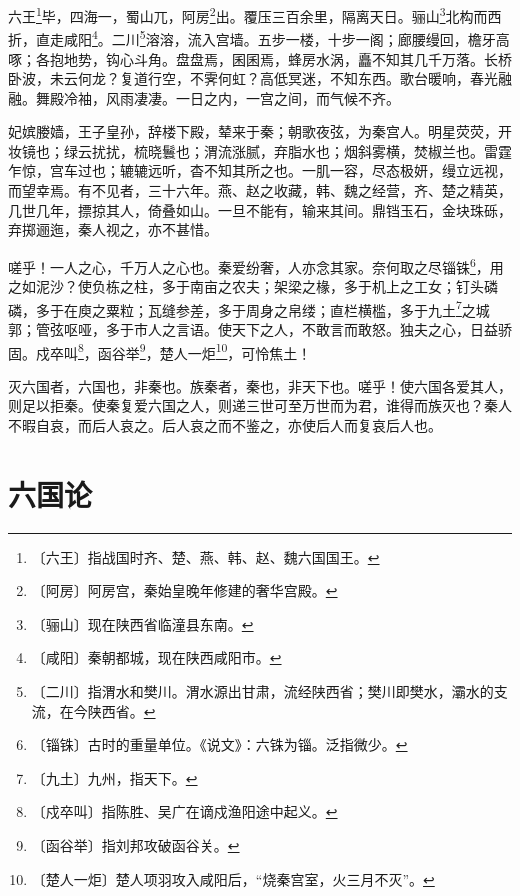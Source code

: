\documentclass[12pt,UTF-8,openany]{ctexbook}
\begin{document}
\begin{normalsize}
    
    六王\footnote{〔六王〕指战国时齐、楚、燕、韩、赵、魏六国国王。}毕，四海一，蜀山兀，阿房\footnote{〔阿房〕阿房宫，秦始皇晚年修建的奢华宫殿。}出。覆压三百余里，隔离天日。骊山\footnote{〔骊山〕现在陕西省临潼县东南。}北构而西折，直走咸阳\footnote{〔咸阳〕秦朝都城，现在陕西咸阳市。}。二川\footnote{〔二川〕指渭水和樊川。渭水源出甘肃，流经陕西省；樊川即樊水，灞水的支流，在今陕西省。}溶溶，流入宫墙。五步一楼，十步一阁；廊腰缦回，檐牙高啄；各抱地势，钩心斗角。盘盘焉，囷囷焉，蜂房水涡，矗不知其几千万落。长桥卧波，未云何龙？复道行空，不霁何虹？高低冥迷，不知东西。歌台暖响，春光融融。舞殿冷袖，风雨凄凄。一日之内，一宫之间，而气候不齐。
    
    妃嫔媵嫱，王子皇孙，辞楼下殿，辇来于秦；朝歌夜弦，为秦宫人。明星荧荧，开妆镜也；绿云扰扰，梳晓鬟也；渭流涨腻，弃脂水也；烟斜雾横，焚椒兰也。雷霆乍惊，宫车过也；辘辘远听，杳不知其所之也。一肌一容，尽态极妍，缦立远视，而望幸焉。有不见者，三十六年。燕、赵之收藏，韩、魏之经营，齐、楚之精英，几世几年，摽掠其人，倚叠如山。一旦不能有，输来其间。鼎铛玉石，金块珠砾，弃掷逦迤，秦人视之，亦不甚惜。
    
    嗟乎！一人之心，千万人之心也。秦爱纷奢，人亦念其家。奈何取之尽锱铢\footnote{〔锱铢〕古时的重量单位。《说文》：六铢为锱。泛指微少。}，用之如泥沙？使负栋之柱，多于南亩之农夫；架梁之椽，多于机上之工女；钉头磷磷，多于在庾之粟粒；瓦缝参差，多于周身之帛缕；直栏横槛，多于九土\footnote{〔九土〕九州，指天下。}之城郭；管弦呕哑，多于市人之言语。使天下之人，不敢言而敢怒。独夫之心，日益骄固。戍卒叫\footnote{〔戍卒叫〕指陈胜、吴广在谪戍渔阳途中起义。}，函谷举\footnote{〔函谷举〕指刘邦攻破函谷关。}，楚人一炬\footnote{〔楚人一炬〕楚人项羽攻入咸阳后，“烧秦宫室，火三月不灭”。}，可怜焦土！
    
    灭六国者，六国也，非秦也。族秦者，秦也，非天下也。嗟乎！使六国各爱其人，则足以拒秦。使秦复爱六国之人，则递三世可至万世而为君，谁得而族灭也？秦人不暇自哀，而后人哀之。后人哀之而不鉴之，亦使后人而复哀后人也。
\end{normalsize}



\chapter{六国论}
\end{document}
